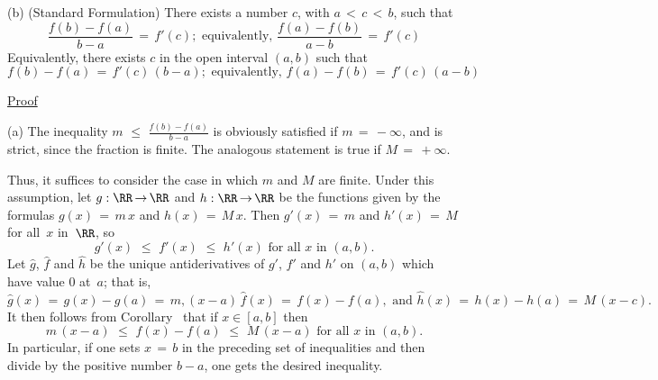 \V

        (b) (Standard Formulation) There exists a number $c$, with $a\,<\,c\,<\,b$, such that
        \begin{equation}
        \label{EqnE.100B}
        \frac{f(b)-f(a)}{b-a} \,=\, f'(c); \mbox{ equivalently, }
        \frac{f(a)-f(b)}{a-b} \,=\, f'(c)
        \end{equation}
    Equivalently, there exists $c$ in the open interval $(a,b)$ such that
        \begin{equation}
        \label{EqnE.100C}
        f(b)-f(a) \,=\, f'(c)\,(b-a); \mbox{ equivalently, } f(a)-f(b) \,=\, f'(c)\,(a-b)
        \end{equation}

\V

        \underline{Proof}

\V

        (a) The inequality ${\displaystyle m\,\,{\leq}\,\,\frac{f(b)-f(a)}{b-a}}$ is obviously satisfied if $m \,=\, -{\infty}$,
    and is strict, since the fraction is finite. The analogous statement is true if $M \,=\, +{\infty}$.

        Thus, it suffices to consider the case in which $m$ and $M$ are finite. Under this assumption,
    let $g:{\RR} \,{\rightarrow}\, {\RR}$ and $h:{\RR} \,{\rightarrow}\, {\RR}$ be the functions given by the formulas $g(x) \,=\, m\,x$ and $h(x) \,=\, M\,x$.
    Then $g'(x) \,=\, m$ and $h'(x) \,=\, M$for all~$x$ in~${\RR}$, so
        \begin{displaymath}
        g'(x)\,\,{\leq}\,\,f'(x)\,\,{\leq}\,\,h'(x) \mbox{ for all $x$ in~$(a,b)$}.
        \end{displaymath}
    Let $\hat{g}$, $\hat{f}$ and $\hat{h}$ be the unique antiderivatives of $g'$, $f'$ and $h'$ on $(a,b)$ which have value $0$ at~$a$;
    that is,
        \begin{displaymath}
        \hat{g}(x) \,=\, g(x) - g(a) \,=\, m,(x-a) \, \hat{f}(x) \,=\, f(x)-f(a), \mbox{ and } \hat{h}(x) \,=\, h(x)-h(a) \,=\, M\,(x-c).
        \end{displaymath}
    It then follows from Corollary~ that if $x{\in}[a,b]$ then
        \begin{displaymath}
        m\,(x-a)\,\,{\leq}\,\,f(x) - f(a)\,\,{\leq}\,\,M\,(x-a) \mbox{ for all $x$ in~$(a,b)$}.
        \end{displaymath}
    In particular, if one sets $x \,=\, b$ in the preceding set of inequalities and then divide by the positive number $b-a$, one gets the desired inequality.

